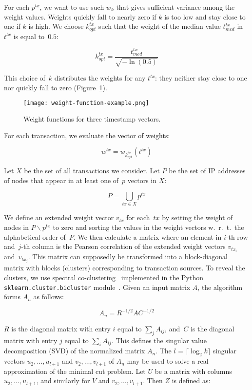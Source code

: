 For each $p^{tx}$, we want to use such $w_k$ that gives sufficient variance among the weight values.
Weights quickly fall to nearly zero if $k$ is too low and stay close to one if $k$ is high.
We choose $k^{tx}_{opt}$ such that the weight of the median value $t^{tx}_{med}$ in~$t^{tx}$ is equal to~$0.5$:

\[
k^{tx}_{opt} = \frac{t^{tx}_{med}}{\sqrt{-\ln(0.5)}}
\]

This choice of~$k$ distributes the weights for any $t^{tx}$: they neither stay close to one nor quickly fall to zero (Figure~\ref{fig:weight}).

\begin{figure}
	\centering
	\texttt{[image: weight-function-example.png]}
	\caption{Weight functions for three timestamp vectors.}
	\label{fig:weight}
\end{figure}
For each transaction, we evaluate the vector of weights:

\[
w^{tx} = w_{k^{tx}_{opt}}(t^{tx})
\]

Let $X$ be the set of all transactions we consider.
Let $P$ be the set of IP addresses of nodes that appear in at least one of~$p$ vectors in $X$:

\[
P = \bigcup\limits_{tx \in X} p^{tx}
\]

We define an extended weight vector $v_{tx}$ for each~$tx$ by setting the weight of nodes in $P \backslash p^{tx}$ to zero and sorting the values in the weight vectors w.~r.~t.~the alphabetical order of~$P$.
We then calculate a matrix where an element in \mbox{$i$-th} row and~\mbox{$j$-th} column is the Pearson correlation of the extended weight vectors $v_{tx_i}$ and~$v_{tx_j}$.
This matrix can supposedly be transformed into a block-diagonal matrix with blocks (clusters) corresponding to transaction sources.
To reveal the clusters, we use spectral co-clustering~\cite{Dhillon2001} implemented in the Python \texttt{sklearn.cluster.bicluster} module~\cite{scikit-learn, scikitlearn2018}.
Given an input matrix $A$, the algorithm forms $A_n$ as follows:

\[
A_n = R^{-1/2}AC^{-1/2}
\]

$R$ is the diagonal matrix with entry $i$ equal to $\sum_{j} A_{ij}$, and~$C$ is the diagonal matrix with entry $j$ equal to $\sum_{i} A_{ij}$.
This defines the singular value decomposition (SVD) of the normalized matrix $A_n$.
The $l$ = $\lceil \log_2 k \rceil$ singular vectors $u_2,\dots,u_{l+1}$ and $v_2,\dots,v_{l+1}$ of $A_n$ may be used to solve a real approximation of the minimal cut problem.
Let $U$ be a matrix with columns $u_2,\dots,u_{l+1}$, and similarly for $V$ and $v_2,\dots,v_{l+1}$.
Then $Z$ is defined as:


